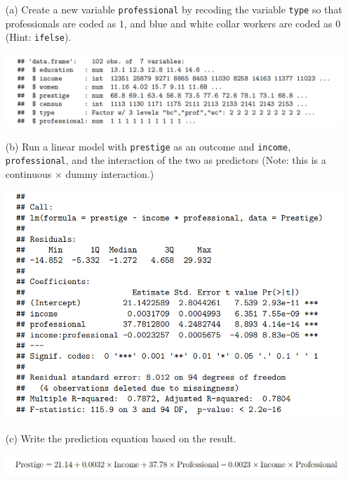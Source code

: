 \documentclass[12pt,letterpaper]{article}
\begin{document}
\newpage
\begin{enumerate}
	
	\item [(a)]
	Create a new variable \texttt{professional} by recoding the variable \texttt{type} so that professionals are coded as $1$, and blue and white collar workers are coded as $0$ (Hint: \texttt{ifelse}).
	
	
    \includegraphics[width=0.9\linewidth]{q1}

	  
	\vspace{1cm}
	

	\item [(b)]
	Run a linear model with \texttt{prestige} as an outcome and \texttt{income}, \texttt{professional}, and the interaction of the two as predictors (Note: this is a continuous $\times$ dummy interaction.)
	\vspace{1cm}
	 
	\includegraphics[width=0.9\linewidth]{q2} 
	\vspace{3cm}
	
	\item [(c)]
	Write the prediction equation based on the result.
	 
	\includegraphics[width=0.9\linewidth]{q3}
	\newpage 
	

\end{enumerate}
\end{document}

